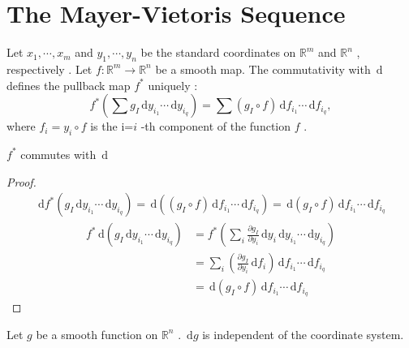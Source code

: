 \documentclass[../main.tex]{subfiles}
\begin{document}
\section{The Mayer-Vietoris Sequence}

\begin{definition}{}{}
   Let \(   x_1,\cdots,x_m   \) and \(   y_1,\cdots,y_n   \) be the standard coordinates on \(  \mathbb{R} ^{m}  \) and \(  \mathbb{R} ^{n}  \) , respectively .      Let \(  f: \mathbb{R} ^{m}\to \mathbb{R} ^{n}  \) be a smooth map. The commutativity with \(  \,\mathrm{d}   \) defines the pullback map \(  f^{*}  \) uniquely   : \[
    f^{*}\left( \sum g_{I}\,\mathrm{d} y_{i_1}\cdots \,\mathrm{d} y_{i_{q}} \right)=  \sum \left( g_{I}\circ f \right) \,\mathrm{d} f_{i_1}\cdots \,\mathrm{d} f_{i_{q}} , 
    \] where \(  f_{i} = y_{i}\circ f  \) is the i=\(  i  \) -th component of the function \(  f   \) .    
\end{definition}

\begin{proposition}{}{}
    \(  f^{*}  \) commutes with \(  \,\mathrm{d}   \)   
\end{proposition}
\begin{proof}
     \[
     \begin{aligned}
     \,\mathrm{d} f^{*}\left( g_{I}\,\mathrm{d} y_{i_1}\cdots \,\mathrm{d} y_{i_{q}} \right)=  \,\mathrm{d} \left( \left( g_{I}\circ f \right) \,\mathrm{d} f_{i_1}\cdots \,\mathrm{d} f_{i_{q}}  \right)  = \,\mathrm{d} \left( g_{I}\circ f \right)\,\mathrm{d} f_{i_1}\cdots \,\mathrm{d} f_{i_{q}}   
     \end{aligned}
     \] \[
     \begin{aligned}
     f^{*}\,\mathrm{d} \left( g_{I} \,\mathrm{d} y_{i_1}\cdots \,\mathrm{d} y_{i_{q}} \right)&=  f^{*}\left( \sum _{i} \frac{\partial g_{I}}{\partial y_{i}} \,\mathrm{d} y_{i}\,\mathrm{d} y_{i_1}\cdots \,\mathrm{d} y_{i_{q}}\right)\\ 
      &= \sum _{i}\left(  \frac{\partial g_{I}}{\partial y_{i}}\,\mathrm{d} f_{i} \right) \,\mathrm{d} f_{i_1}\cdots \,\mathrm{d} f_{i_{q}}\\ 
       &=  \,\mathrm{d} \left( g_{I}\circ f \right)     \,\mathrm{d} f_{i_1}\cdots \,\mathrm{d} f_{i_{q}}
     \end{aligned}
     \]
\end{proof}

\begin{proposition}{}{}
  Let \(  g  \) be a smooth function on \(  \mathbb{R} ^{n}  \) .     \(  \,\mathrm{d} g  \) is independent of the coordinate system. 
\end{proposition}
\end{document}
